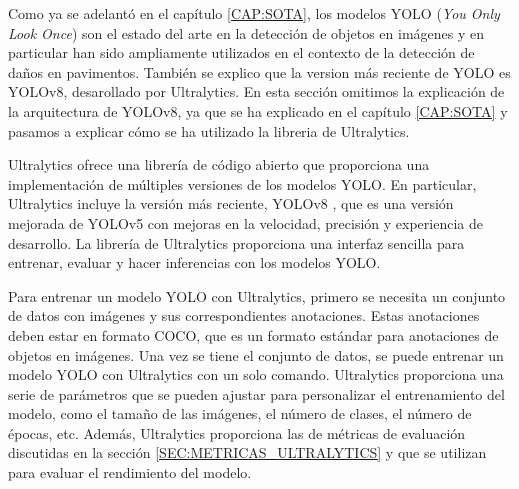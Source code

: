 Como ya se adelantó en el capítulo \ref{CAP:SOTA}, los modelos YOLO (\textit{You Only Look Once}) son el estado del arte en la detección de objetos en imágenes y en particular han sido ampliamente utilizados en el contexto de la detección de daños en pavimentos. También se explico que la version más reciente de YOLO es YOLOv8, desarollado por Ultralytics. En esta sección omitimos la explicación de la arquitectura de YOLOv8, ya que se ha explicado en el capítulo \ref{CAP:SOTA} y pasamos a explicar cómo se ha utilizado la libreria de Ultralytics.

Ultralytics ofrece una librería de código abierto que proporciona una implementación de múltiples versiones de los modelos YOLO. En particular, Ultralytics incluye la versión más reciente, YOLOv8 \cite{yolov8_ultralytics}, que es una versión mejorada de YOLOv5 con mejoras en la velocidad, precisión y experiencia de desarrollo. La librería de Ultralytics proporciona una interfaz sencilla para entrenar, evaluar y hacer inferencias con los modelos YOLO.

Para entrenar un modelo YOLO con Ultralytics, primero se necesita un conjunto de datos con imágenes y sus correspondientes anotaciones. Estas anotaciones deben estar en formato COCO, que es un formato estándar para anotaciones de objetos en imágenes. Una vez se tiene el conjunto de datos, se puede entrenar un modelo YOLO con Ultralytics con un solo comando. Ultralytics proporciona una serie de parámetros que se pueden ajustar para personalizar el entrenamiento del modelo, como el tamaño de las imágenes, el número de clases, el número de épocas, etc. Además, Ultralytics proporciona las de métricas de evaluación discutidas en la sección \ref{SEC:METRICAS_ULTRALYTICS} y que se utilizan para evaluar el rendimiento del modelo.
